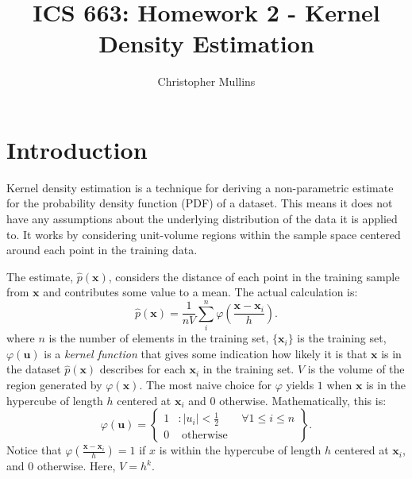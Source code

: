 \documentclass{article}
\begin{document}
\title{ICS 663: Homework 2 - Kernel Density Estimation}
\author{Christopher Mullins}
\maketitle

\noindent\hrulefill
\vspace{-5mm} %
\tableofcontents
\noindent\hrulefill

\section{Introduction}

Kernel density estimation is a technique for deriving a non-parametric estimate
for the probability density function (PDF) of a dataset. This means it does not
have any assumptions about the underlying distribution of the data it is applied
to.  It works by considering unit-volume regions within the sample space
centered around each point in the training data. 

The estimate, $\hat{p}(\mathbf{x})$, considers the distance of each point in the
training sample from $\mathbf{x}$ and contributes some value to a mean. The
actual calculation is:
\[
	\hat{p}(\mathbf{x}) = \frac{1}{nV} \sum_{i}^{n}
\varphi\left(\frac{\mathbf{x}-\mathbf{x}_i}{h}\right). \]
where $n$ is the number of elements in the training set, $\{ \mathbf{x}_i \}$ is
the training set, $\varphi(\mathbf{u})$ is a {\it kernel function} that
gives some indication how likely it is that $\mathbf{x}$ is in the dataset
$\hat{p}(\mathbf{x})$ describes for each $\mathbf{x}_i$ in the training set.
$V$ is the volume of the region generated by $\varphi(\mathbf{x})$. The most
naive choice for $\varphi$ yields $1$ when $\mathbf{x}$ is in the hypercube of
length $h$ centered at $\mathbf{x}_i$ and $0$ otherwise. Mathematically, this
is:
\[
	\varphi(\mathbf{u}) = \left\{
		\begin{array}{lr}
			1 & : \left| u_i \right| < \frac{1}{2} \qquad \forall 1 \leq i \leq n \\
			0 & \mbox{ otherwise }
		\end{array}
	\right\}.
\]
Notice that $\varphi\left(\frac{\mathbf{x}-\mathbf{x}_i}{h}\right)=1$ if $x$ is
within the hypercube of length $h$ centered at $\mathbf{x}_i$, and $0$
otherwise. Here, $V=h^k$. 
\end{document}
